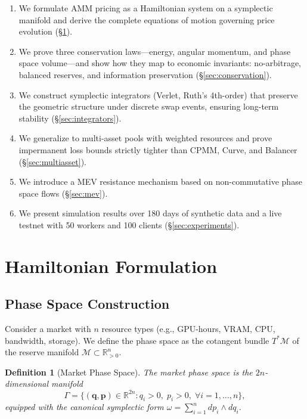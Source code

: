 \documentclass[11pt,twocolumn]{article}
\newtheorem{definition}{Definition}
\begin{document}
\begin{enumerate}[leftmargin=1.4em]
    \item We formulate AMM pricing as a Hamiltonian system on a symplectic manifold and derive the complete equations of motion governing price evolution (\S\ref{sec:formulation}).
    \item We prove three conservation laws---energy, angular momentum, and phase space volume---and show how they map to economic invariants: no-arbitrage, balanced reserves, and information preservation (\S\ref{sec:conservation}).
    \item We construct symplectic integrators (Verlet, Ruth's 4th-order) that preserve the geometric structure under discrete swap events, ensuring long-term stability (\S\ref{sec:integrators}).
    \item We generalize to multi-asset pools with weighted resources and prove impermanent loss bounds strictly tighter than CPMM, Curve, and Balancer (\S\ref{sec:multiasset}).
    \item We introduce a MEV resistance mechanism based on non-commutative phase space flows (\S\ref{sec:mev}).
    \item We present simulation results over 180 days of synthetic data and a live testnet with 50 workers and 100 clients (\S\ref{sec:experiments}).
\end{enumerate}

\section{Hamiltonian Formulation}
\label{sec:formulation}

\subsection{Phase Space Construction}

Consider a market with $n$ resource types (e.g., GPU-hours, VRAM, CPU, bandwidth, storage). We define the phase space as the cotangent bundle $T^*\mathcal{M}$ of the reserve manifold $\mathcal{M} \subset \mathbb{R}^n_{>0}$.

\begin{definition}[Market Phase Space]
The market phase space is the $2n$-dimensional manifold
\begin{equation}
\Gamma = \{(\bm{q}, \bm{p}) \in \mathbb{R}^{2n} : q_i > 0, \; p_i > 0, \; \forall i = 1, \ldots, n\},
\end{equation}
equipped with the canonical symplectic form $\omega = \sum_{i=1}^n dp_i \wedge dq_i$.
\end{definition}
\end{document}
